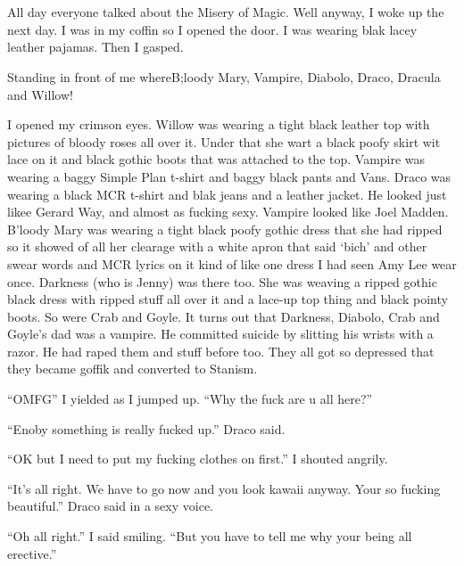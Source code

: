 \section{}



All day everyone talked about the Misery of Magic. Well anyway, I woke up the next day. I was in my coffin so I opened the door. I was wearing blak lacey leather pajamas. Then I gasped.

Standing in front of me where\dotfill\newline B;loody Mary, Vampire, Diabolo, Draco, Dracula and Willow!

I opened my crimson eyes. Willow was wearing a tight black leather top with pictures of bloody roses all over it. Under that she wart a black poofy skirt wit lace on it and black gothic boots that was attached to the top. Vampire was wearing a baggy Simple Plan t-shirt and baggy black pants and Vans. Draco was wearing a black MCR t-shirt and blak jeans and a leather jacket. He looked just likee Gerard Way, and almost as fucking sexy. Vampire looked like Joel Madden. B'loody Mary was wearing a tight black poofy gothic dress that she had ripped so it showed of all her clearage with a white apron that said \enquote*{bich} and other swear words and MCR lyrics on it kind of like one dress I had seen Amy Lee wear once. Darkness (who is Jenny) was there too. She was weaving a ripped gothic black dress with ripped stuff all over it and a lace-up top thing and black pointy boots. So were Crab and Goyle. It turns out that Darkness, Diabolo, Crab and Goyle's dad was a vampire. He committed suicide by slitting his wrists with a razor. He had raped them and stuff before too. They all got so depressed that they became goffik and converted to Stanism.

\enquote{OMFG} I yielded as I jumped up. \enquote{Why the fuck are u all here?}

\enquote{Enoby something is really fucked up.} Draco said.

\enquote{OK but I need to put my fucking clothes on first.} I shouted angrily.

\enquote{It's all right. We have to go now and you look kawaii anyway. Your so fucking beautiful.} Draco said in a sexy voice.

\enquote{Oh all right.} I said smiling. \enquote{But you have to tell me why your being all erective.}

